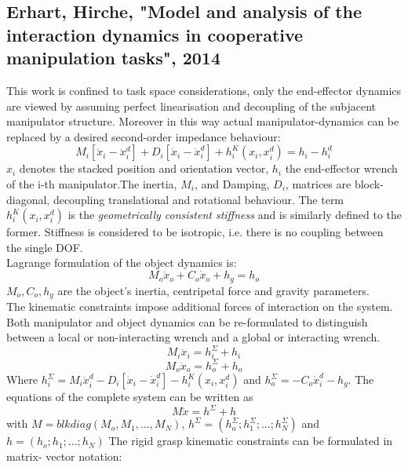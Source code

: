 \documentclass[conference]{IEEEtran}
\begin{document}
\subsection{Erhart, Hirche, "Model and analysis of the interaction dynamics in cooperative manipulation tasks", 2014}
This work is confined to task space considerations, only the end-effector dynamics are viewed by assuming perfect linearisation and decoupling of the subjacent manipulator structure. Moreover in this way actual manipulator-dynamics can be replaced by a desired second-order impedance behaviour:
\begin{equation}
M_i[\ddot{x}_i - \ddot{x}_i^d] + D_i[\dot{x}_i - \dot{x}_i^d] + h_i^K(x_i,x_i^d) = h_i - h_i^d
\end{equation}
$ x_i $ denotes the stacked position and orientation vector, $ h_i $ the end-effector wrench of the i-th manipulator.The inertia, $ M_i $, and Damping, $ D_i $, matrices are block-diagonal, decoupling translational and rotational behaviour. The term $ h_i^K(x_i,x_i^d) $ is the \textit{geometrically consistent stiffness} and is similarly defined to the former. Stiffness is considered to be isotropic, i.e. there is no coupling between the single DOF. \\
Lagrange formulation of the object dynamics is:
\begin{equation}
M_o \ddot{x}_o + C_o\dot{x}_o + h_g = h_o
\end{equation}
$ M_o, C_o, h_g $ are the object's inertia, centripetal force and gravity parameters. \\
The kinematic constraints impose additional forces of interaction on the system. Both manipulator and object dynamics can be re-formulated to distinguish between a local or non-interacting wrench and a global or interacting wrench. 
\begin{equation}
	M_i \ddot{x}_i  = h_i^\Sigma + h_i
\end{equation}
\begin{equation}
M_o \ddot{x}_o  = h_o^\Sigma + h_o
\end{equation}
Where $ h_i^\Sigma = M_i\ddot{x}_i^d - D_i[\dot{x}_i - \dot{x}_i^d] - h_i^K(x_i,x_i^d) $ and  $ h_o^\Sigma = -C_o\dot{x}_i^d - h_g $. The equations of the complete system can be written as
\begin{equation}
M \ddot{x} = h^\Sigma + h
\end{equation}
with $ M = blkdiag(M_o,M_1,...,M_N) $, $ h^\Sigma = (h_o^\Sigma;h_1^\Sigma;...;h_N^\Sigma) $ and $ h = (h_o;h_1;...;h_N) $
The rigid grasp kinematic constraints can be formulated in matrix- vector notation:
\end{document}
